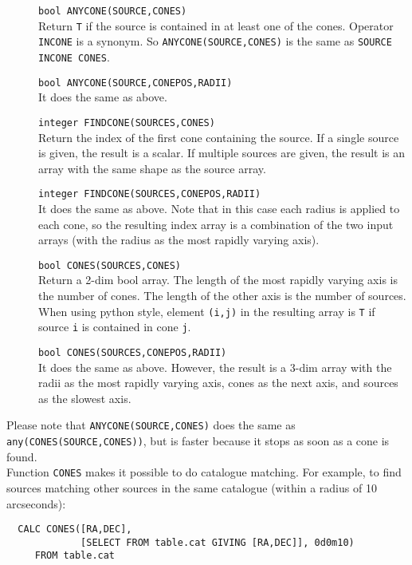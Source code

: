 \begin{description}
  \item[] \texttt{bool ANYCONE(SOURCE,CONES)}\\
       Return \texttt{T} if the source is contained in at least one of the cones.
       Operator \texttt{INCONE} is a synonym. So
       \texttt{ANYCONE(SOURCE,CONES)} is the same as
       \texttt{SOURCE INCONE CONES}.
  \item[] \texttt{bool ANYCONE(SOURCE,CONEPOS,RADII)}\\
       It does the same as above.
  \item[] \texttt{integer FINDCONE(SOURCES,CONES)}\\
       Return the index of the first cone containing the source.
       If a single source is given, the result is a scalar.
       If multiple sources are given, the result is an array with the
       same shape as the source array.
  \item[] \texttt{integer FINDCONE(SOURCES,CONEPOS,RADII)}\\
       It does the same as above. Note that in this case each radius is
       applied to each cone, so the resulting index array
       is a combination of the two input arrays
       (with the radius as the most rapidly varying axis).
  \item[] \texttt{bool CONES(SOURCES,CONES)}\\
       Return a 2-dim bool array. The length of the most rapidly
       varying axis is the
       number of cones. The length of the other axis is the number of
       sources. When using python style, element \texttt{(i,j)}
       in the resulting array is \texttt{T}
       if source \texttt{i} is contained in cone \texttt{j}.
  \item[] \texttt{bool CONES(SOURCES,CONEPOS,RADII)}\\
       It does the same as above. However, the result is a 3-dim array
       with the radii as the most rapidly varying axis, cones as the
       next axis, and sources as the slowest axis.
\end{description}
Please note that \texttt{ANYCONE(SOURCE,CONES)} does the same as
\texttt{any(CONES(SOURCE,CONES))}, but is faster because it stops as
soon as a cone is found.
\\Function \texttt{CONES} makes it possible to do catalogue matching.
For example, to find sources matching other sources in the same
catalogue (within a radius of 10 arcseconds):
\begin{verbatim}
  CALC CONES([RA,DEC],
             [SELECT FROM table.cat GIVING [RA,DEC]], 0d0m10)
     FROM table.cat
\end{verbatim}
